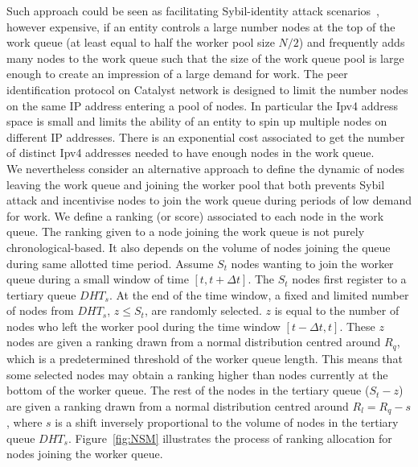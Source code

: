 Such approach could be seen as facilitating Sybil-identity attack scenarios~\cite{sybil}, however expensive, if an entity controls a large number nodes at the top of the work queue (at least equal to half the worker pool size $N/2$) and frequently adds many nodes to the work queue such that the size of the work queue pool is large enough to create an impression of a large demand for work. The peer identification protocol on Catalyst network is designed to limit the number nodes on the same IP address entering a pool of nodes. In particular the Ipv4 address space is small and limits the ability of an entity to spin up multiple nodes on different IP addresses. There is an exponential cost associated to get the number of distinct Ipv4 addresses needed to have enough nodes in the work queue. \\

We nevertheless consider an alternative approach to define the dynamic of nodes leaving the work queue and joining the worker pool that both prevents Sybil attack and incentivise nodes to join the work queue during periods of low demand for work. We define a ranking (or score) associated to each node in the work queue. The ranking given to a node joining the work queue is not purely chronological-based. It also depends on the volume of nodes joining the queue during same allotted time period. Assume $S_t$ nodes wanting to join the worker queue during a small window of time $[t, t+\Delta t]$. The $S_t$ nodes first register to a tertiary queue $DHT_s$. At the end of the time window, a fixed and limited number of nodes from $DHT_s$, $z \leq S_t$, are randomly selected. $z$ is equal to the number of nodes who left the worker pool during the time window  $[t-\Delta t, t]$. These $z$ nodes are given a ranking drawn from a normal distribution centred around $R_q$, which is a predetermined threshold of the worker queue length. This means that some selected nodes may obtain a ranking higher than nodes currently at the bottom of the worker queue. The rest of the nodes in the tertiary queue ($S_t-z$) are given a ranking drawn from a normal distribution centred around $R_l = R_q - s$, where $s$ is a shift inversely proportional to the volume of nodes in the tertiary queue $DHT_s$. Figure~\ref{fig:NSM} illustrates the process of ranking allocation for nodes joining the worker queue. 


